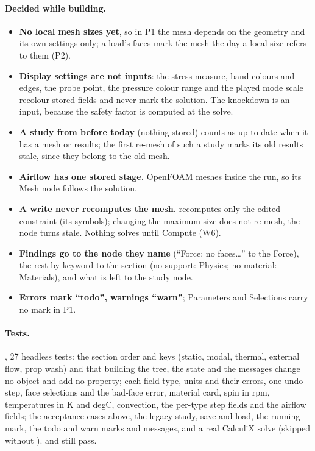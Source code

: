 \paragraph{Decided while building.}
\begin{itemize}[nosep]
  \item \textbf{No local mesh sizes yet}, so in P1 the mesh depends on the geometry and its own settings only; a load's
        faces mark the mesh the day a local size refers to them (P2).
  \item \textbf{Display settings are not inputs}: the stress measure, band colours and edges, the probe point, the
        pressure colour range and the played mode scale recolour stored fields and never mark the solution. The
        knockdown is an input, because the safety factor is computed at the solve.
  \item \textbf{A study from before today} (nothing stored) counts as up to date when it has a mesh or results; the
        first re-mesh of such a study marks its old results stale, since they belong to the old mesh.
  \item \textbf{Airflow has one stored stage.} OpenFOAM meshes inside the run, so its Mesh node follows the solution.
  \item \textbf{A write never recomputes the mesh.}  recomputes only the edited constraint (its
        symbols); changing the maximum size does not re-mesh, the node turns stale. Nothing solves until Compute (W6).
  \item \textbf{Findings go to the node they name} (``Force: no faces\ldots'' to the Force), the rest by keyword to the
        section (no support: Physics; no material: Materials), and what is left to the study node.
  \item \textbf{Errors mark ``todo'', warnings ``warn''}; Parameters and Selections carry no mark in P1.
\end{itemize}

\paragraph{Tests.} , 27 headless tests: the section order and keys (static, modal,
thermal, external flow, prop wash) and that building the tree, the state and the messages change no object and add no
property; each field type, units and their errors, one undo step, face selections and the bad-face error, material
card, spin in rpm, temperatures in K and degC, convection, the per-type step fields and the airflow fields; the
acceptance cases above, the legacy study, save and load, the running mark, the todo and warn marks and messages, and a
real CalculiX solve (skipped without ).  and  still pass.

